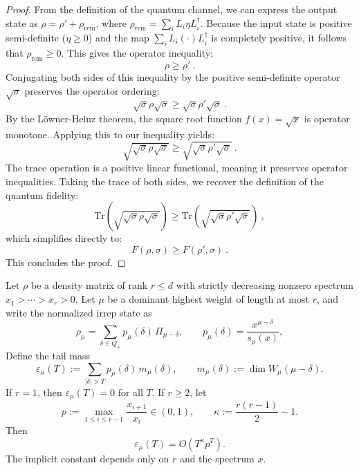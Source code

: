 \documentclass[a4paper,onecolumn,11pt]{quantumarticle}
\providecommand{\customgenericname}{}
\newenvironment{mlemma}[1]{%
  \renewcommand\customgenericname{Lemma}%
  \renewcommand\theinnercustomgeneric{#1}%
  \innercustomgeneric
}{\endinnercustomgeneric}
\begin{document}
\begin{proof}
From the definition of the quantum channel, we can express the output state as $\rho = \rho' + \rho_{\text{rem}}$, where $\rho_{\text{rem}} = \sum_i L_i \eta L_i^\dagger$. Because the input state is positive semi-definite ($\eta \geq 0$) and the map $\sum_i L_i (\cdot) L_i^\dagger$ is completely positive, it follows that $\rho_{\text{rem}} \geq 0$. This gives the operator inequality:
\begin{equation}
    \rho \geq \rho' \ .
\end{equation}
Conjugating both sides of this inequality by the positive semi-definite operator $\sqrt{\sigma}$ preserves the operator ordering:
\begin{equation}
    \sqrt{\sigma} \rho \sqrt{\sigma} \geq \sqrt{\sigma} \rho' \sqrt{\sigma} \ .
\end{equation}
By the L\"owner-Heinz theorem, the square root function $f(x) = \sqrt{x}$ is operator monotone. Applying this to our inequality yields:
\begin{equation}
    \sqrt{\sqrt{\sigma} \rho \sqrt{\sigma}} \geq \sqrt{\sqrt{\sigma} \rho' \sqrt{\sigma}} \ .
\end{equation}
The trace operation is a positive linear functional, meaning it preserves operator inequalities. Taking the trace of both sides, we recover the definition of the quantum fidelity:
\begin{equation}
    \text{Tr}\left(\sqrt{\sqrt{\sigma} \rho \sqrt{\sigma}}\right) \geq \text{Tr}\left(\sqrt{\sqrt{\sigma} \rho' \sqrt{\sigma}}\right) \ ,
\end{equation}
which simplifies directly to:
\begin{equation}
    F(\rho, \sigma) \geq F(\rho', \sigma) \ .
\end{equation}
This concludes the proof.
\end{proof}


\begin{mlemma}{8}[Tail mass]
Let \(\rho\) be a density matrix of rank \(r\le d\) with strictly decreasing nonzero spectrum \(x_1>\cdots>x_r>0\).
Let \(\mu\) be a dominant highest weight of length at most \(r\), and write the normalized irrep state as
\[
    \rho_\mu
    =
    \sum_{\delta\in Q_+} p_\mu(\delta)\,\Pi_{\mu-\delta},
    \qquad
    p_\mu(\delta)=\frac{x^{\mu-\delta}}{s_\mu(x)},
\]
Define the tail mass
\begin{equation}
    \varepsilon_\mu(T)
    := 
    \sum_{|\delta|>T} p_\mu(\delta)\,m_\mu(\delta),
    \qquad
    m_\mu(\delta):= \dim W_\mu(\mu-\delta).
\end{equation}
If \(r=1\), then \(\varepsilon_\mu(T)=0\) for all \(T\).
If \(r\ge 2\), let
\begin{equation}
    p:= \max_{1\le i\le r-1}\frac{x_{i+1}}{x_i}\in (0,1),
    \qquad
    \kappa:= \frac{r(r-1)}2-1.
\end{equation}
Then
\begin{equation}
    \varepsilon_\mu(T)=O\!\left(T^\kappa p^T\right).
\end{equation}
The implicit constant depends only on \(r\) and the spectrum \(x\).
\end{mlemma}
\end{document}
